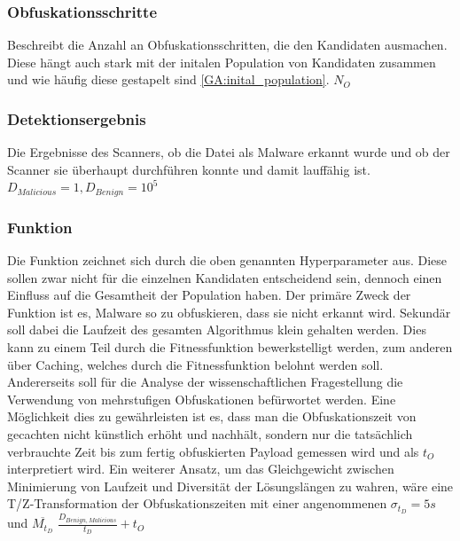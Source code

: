     \subsubsection{Obfuskationsschritte}
    Beschreibt die Anzahl an Obfuskationsschritten, die den Kandidaten ausmachen. Diese hängt auch stark mit der initalen Population von Kandidaten zusammen und wie häufig diese gestapelt sind \ref{GA:inital_population}. $N_O$
    
    \subsubsection{Detektionsergebnis}
    Die Ergebnisse des Scanners, ob die Datei als Malware erkannt wurde und ob der Scanner sie überhaupt durchführen konnte und damit lauffähig ist. $D_{Malicious}=1, D_{Benign}=10^5$
    
    \subsubsection{Funktion}
    Die Funktion zeichnet sich durch die oben genannten Hyperparameter aus. Diese sollen zwar nicht für die einzelnen Kandidaten entscheidend sein, dennoch einen Einfluss auf die Gesamtheit der Population haben.
    Der primäre Zweck der Funktion ist es, Malware so zu obfuskieren, dass sie nicht erkannt wird. Sekundär soll dabei die Laufzeit des gesamten Algorithmus klein gehalten werden. Dies kann zu einem Teil durch die Fitnessfunktion bewerkstelligt werden, zum anderen über Caching, welches durch die Fitnessfunktion belohnt werden soll. Andererseits soll für die Analyse der wissenschaftlichen Fragestellung die Verwendung von mehrstufigen Obfuskationen befürwortet werden. Eine Möglichkeit dies zu gewährleisten ist es, dass man die Obfuskationszeit von gecachten nicht künstlich erhöht und nachhält, sondern nur die tatsächlich verbrauchte Zeit bis zum fertig obfuskierten Payload gemessen wird und als $t_O$ interpretiert wird.
    Ein weiterer Ansatz, um das Gleichgewicht zwischen Minimierung von Laufzeit und Diversität der Lösungslängen zu wahren, wäre eine T/Z-Transformation der Obfuskationszeiten mit einer angenommenen $\sigma _{t_D}=5s$ und $\overline{M_{t_D}}$
    $\frac{D_{Benign, Malicious}}{t_D}+t_O$
    

